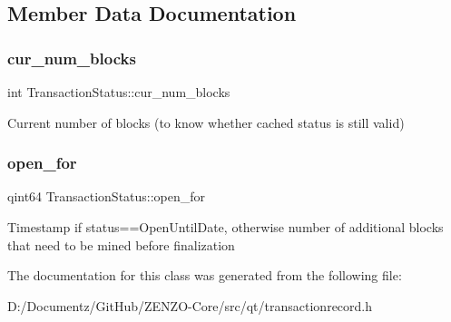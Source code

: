 \subsection{Member Data Documentation}
\mbox{\label{class_transaction_status_a22839cc23993e849a6c9fed8bffd5f50}} 
\subsubsection{\texorpdfstring{cur\_num\_blocks}{cur\_num\_blocks}}
{\footnotesize\ttfamily int Transaction\+Status\+::cur\+\_\+num\+\_\+blocks}

Current number of blocks (to know whether cached status is still valid) \mbox{\label{class_transaction_status_a861ed66c0fd49440bc1aacab5315a938}} 
\subsubsection{\texorpdfstring{open\_for}{open\_for}}
{\footnotesize\ttfamily qint64 Transaction\+Status\+::open\+\_\+for}

Timestamp if status==Open\+Until\+Date, otherwise number of additional blocks that need to be mined before finalization 

The documentation for this class was generated from the following file\+:\begin{DoxyCompactItemize}
\item 
D\+:/\+Documentz/\+Git\+Hub/\+Z\+E\+N\+Z\+O-\/\+Core/src/qt/transactionrecord.\+h\end{DoxyCompactItemize}
